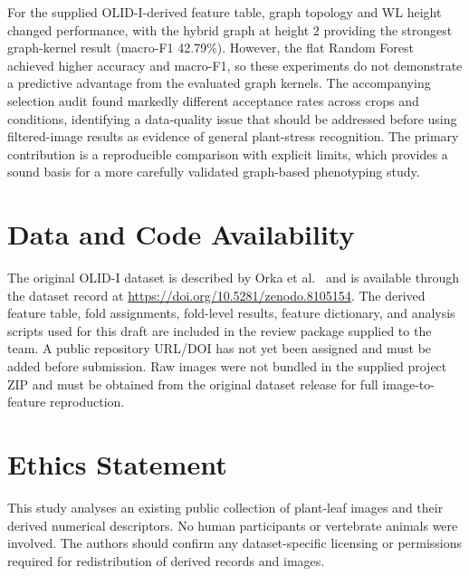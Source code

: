 \documentclass[conference]{IEEEtran}
\begin{document}
For the supplied OLID-I-derived feature table, graph topology and WL height changed performance, with the hybrid graph at height 2 providing the strongest graph-kernel result (macro-F1 42.79\%). However, the flat Random Forest achieved higher accuracy and macro-F1, so these experiments do not demonstrate a predictive advantage from the evaluated graph kernels. The accompanying selection audit found markedly different acceptance rates across crops and conditions, identifying a data-quality issue that should be addressed before using filtered-image results as evidence of general plant-stress recognition. The primary contribution is a reproducible comparison with explicit limits, which provides a sound basis for a more carefully validated graph-based phenotyping study.

\section*{Data and Code Availability}
The original OLID-I dataset is described by Orka et al.~\cite{Orka2023} and is available through the dataset record at \url{https://doi.org/10.5281/zenodo.8105154}. The derived feature table, fold assignments, fold-level results, feature dictionary, and analysis scripts used for this draft are included in the review package supplied to the team. A public repository URL/DOI has not yet been assigned and must be added before submission. Raw images were not bundled in the supplied project ZIP and must be obtained from the original dataset release for full image-to-feature reproduction.

\section*{Ethics Statement}
This study analyses an existing public collection of plant-leaf images and their derived numerical descriptors. No human participants or vertebrate animals were involved. The authors should confirm any dataset-specific licensing or permissions required for redistribution of derived records and images.

\end{document}
